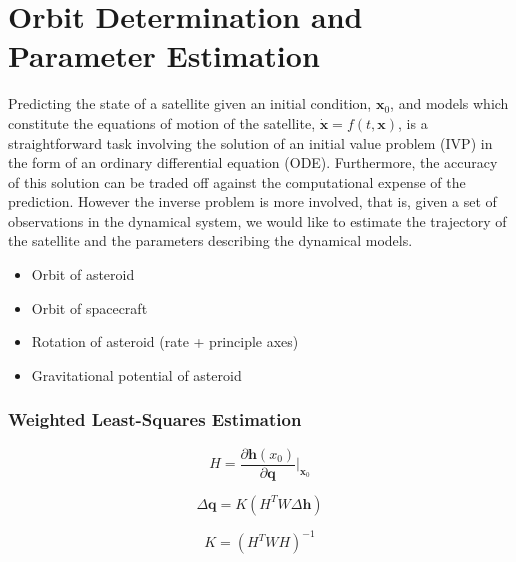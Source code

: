\section{Orbit Determination and Parameter Estimation}

Predicting the state of a satellite given an initial condition, $\mathbf{x}_0$,
and models which constitute the equations of motion of the satellite,
$\dot{\mathbf{x}}=f(t,\mathbf{x})$, is a straightforward task involving the
solution of an initial value problem (IVP) in the form of an ordinary
differential equation (ODE). Furthermore, the accuracy of this solution can be
traded off against the computational expense of the prediction. However the
inverse problem  is more involved, that is, given a set of observations in the
dynamical system, we would like to estimate the trajectory of the satellite and
the parameters describing the dynamical models.

\begin{itemize}
    \item Orbit of asteroid
    \item Orbit of spacecraft
    \item Rotation of asteroid (rate + principle axes)
    \item Gravitational potential of asteroid
\end{itemize}

\subsubsection{Weighted Least-Squares Estimation}



\begin{equation}
    H=\frac{\partial{\mathbf{h}(x_0)}}{\partial{\mathbf{q}}}\bigg|_{\mathbf{x}_0}
\end{equation}

\begin{equation}
    \Delta{\mathbf{q}}=K(H^{T}W\Delta{\mathbf{h}})
\end{equation}

\begin{equation}
    K=(H^{T}WH)^{-1}
\end{equation}


